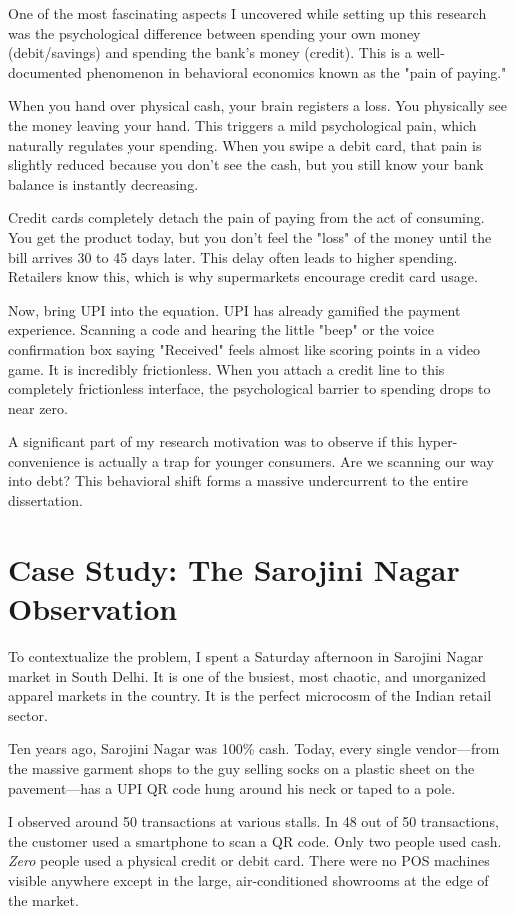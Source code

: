 One of the most fascinating aspects I uncovered while setting up this research was the psychological difference between spending your own money (debit/savings) and spending the bank's money (credit). This is a well-documented phenomenon in behavioral economics known as the "pain of paying."

When you hand over physical cash, your brain registers a loss. You physically see the money leaving your hand. This triggers a mild psychological pain, which naturally regulates your spending. When you swipe a debit card, that pain is slightly reduced because you don't see the cash, but you still know your bank balance is instantly decreasing.

Credit cards completely detach the pain of paying from the act of consuming. You get the product today, but you don't feel the "loss" of the money until the bill arrives 30 to 45 days later. This delay often leads to higher spending. Retailers know this, which is why supermarkets encourage credit card usage.

Now, bring UPI into the equation. UPI has already gamified the payment experience. Scanning a code and hearing the little "beep" or the voice confirmation box saying "Received" feels almost like scoring points in a video game. It is incredibly frictionless. When you attach a credit line to this completely frictionless interface, the psychological barrier to spending drops to near zero.

A significant part of my research motivation was to observe if this hyper-convenience is actually a trap for younger consumers. Are we scanning our way into debt? This behavioral shift forms a massive undercurrent to the entire dissertation.

\section{Case Study: The Sarojini Nagar Observation}

To contextualize the problem, I spent a Saturday afternoon in Sarojini Nagar market in South Delhi. It is one of the busiest, most chaotic, and unorganized apparel markets in the country. It is the perfect microcosm of the Indian retail sector.

Ten years ago, Sarojini Nagar was 100\% cash. Today, every single vendor---from the massive garment shops to the guy selling socks on a plastic sheet on the pavement---has a UPI QR code hung around his neck or taped to a pole.

I observed around 50 transactions at various stalls. In 48 out of 50 transactions, the customer used a smartphone to scan a QR code. Only two people used cash. \textit{Zero} people used a physical credit or debit card. There were no POS machines visible anywhere except in the large, air-conditioned showrooms at the edge of the market.

